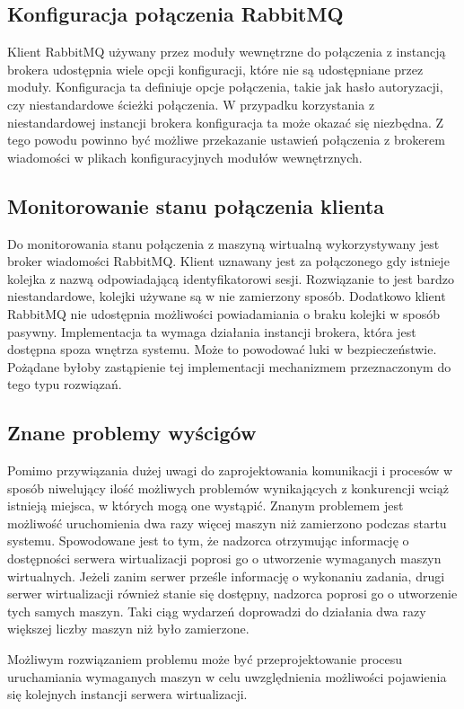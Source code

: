 \documentclass[../podsumowanie.tex]{subfiles}
\begin{document}
\subsection{Konfiguracja połączenia RabbitMQ}

Klient RabbitMQ używany przez moduły wewnętrzne do połączenia z instancją brokera udostępnia wiele opcji konfiguracji, które nie są udostępniane przez moduły. Konfiguracja ta definiuje opcje połączenia, takie jak hasło autoryzacji, czy niestandardowe ścieżki połączenia. W przypadku korzystania z niestandardowej instancji brokera konfiguracja ta może okazać się niezbędna. Z tego powodu powinno być możliwe przekazanie ustawień połączenia z brokerem wiadomości w plikach konfiguracyjnych modułów wewnętrznych.

\subsection{Monitorowanie stanu połączenia klienta}

Do monitorowania stanu połączenia z maszyną wirtualną wykorzystywany jest broker wiadomości RabbitMQ. Klient uznawany jest za połączonego gdy istnieje kolejka z nazwą odpowiadającą identyfikatorowi sesji. Rozwiązanie to jest bardzo niestandardowe, kolejki używane są w nie zamierzony sposób. Dodatkowo klient RabbitMQ nie udostępnia możliwości powiadamiania o braku kolejki w sposób pasywny. Implementacja ta wymaga działania instancji brokera, która jest dostępna spoza wnętrza systemu. Może to powodować luki w bezpieczeństwie. Pożądane byłoby zastąpienie tej implementacji mechanizmem przeznaczonym do tego typu rozwiązań.

\subsection{Znane problemy wyścigów}

Pomimo przywiązania dużej uwagi do zaprojektowania komunikacji i procesów w sposób niwelujący ilość możliwych problemów wynikających z konkurencji wciąż istnieją miejsca, w których mogą one wystąpić. Znanym problemem jest możliwość uruchomienia dwa razy więcej maszyn niż zamierzono podczas startu systemu. Spowodowane jest to tym, że nadzorca otrzymując informację o dostępności serwera wirtualizacji poprosi go o utworzenie wymaganych maszyn wirtualnych. Jeżeli zanim serwer prześle informację o wykonaniu zadania, drugi serwer wirtualizacji również stanie się dostępny, nadzorca poprosi go o utworzenie tych samych maszyn. Taki ciąg wydarzeń doprowadzi do działania dwa razy większej liczby maszyn niż było zamierzone.

Możliwym rozwiązaniem problemu może być przeprojektowanie procesu uruchamiania wymaganych maszyn w celu uwzględnienia możliwości pojawienia się kolejnych instancji serwera wirtualizacji.
\end{document}
